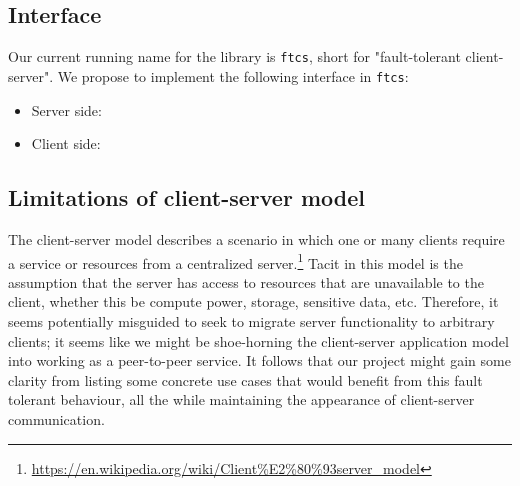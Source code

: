 \subsection{Interface}

Our current running name for the library is \texttt{ftcs}, short for "fault-tolerant client-server". We propose to implement the following interface in \texttt{ftcs}:

\begin{itemize}
	\item Server side:
    \begin{itemize}
    \end{itemize}
    \item Client side:
    	\begin{itemize}
    	\end{itemize}
\end{itemize}

\subsection{Limitations of client-server model}

The client-server model describes a scenario in which one or many clients require a service or resources from a centralized server.\footnote{\url{https://en.wikipedia.org/wiki/Client\%E2\%80\%93server\_model}} Tacit in this model is the assumption that the server has access to resources that are unavailable to the client, whether this be compute power, storage, sensitive data, etc. Therefore, it seems potentially misguided to seek to migrate server functionality to arbitrary clients; it seems like we might be shoe-horning the client-server application model into working as a peer-to-peer service. It follows that our project might gain some clarity from listing some concrete use cases that would benefit from this fault tolerant behaviour, all the while maintaining the appearance of client-server communication. 

